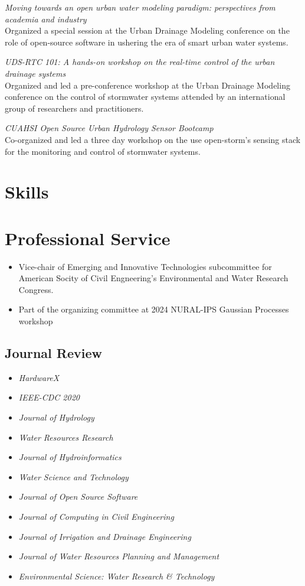 \documentclass[a4paper,11pt]{article}
\newcommand{\years}[1]{%
  {\reversemarginpar\strut\marginnote{{\small#1}}}%
}
\begin{document}
\years{2022} \emph{Moving towards an open urban water modeling paradigm: perspectives from
academia and industry}\\[.05cm]

Organized a special session at the Urban Drainage Modeling conference on the
role of open-source software in ushering the era of smart urban water systems.

\years{2022} \emph{UDS-RTC 101: A hands-on workshop on the real-time control of the urban
drainage systems}\\[.05cm]

Organized and led a pre-conference workshop at the Urban Drainage Modeling
conference on the control of stormwater systems attended by an international
group of researchers and practitioners.

\years{2017, 2019} \emph{CUAHSI Open Source Urban Hydrology Sensor Bootcamp}\\[.05cm]

Co-organized and led a three day workshop on the use open-storm’s sensing stack
for the monitoring and control of stormwater systems.

\section*{Skills}

\section*{Professional Service}
\begin{itemize}
	\item Vice-chair of Emerging and Innovative Technologies subcommittee for American Socity of Civil Engneering's Environmental and Water Research Congress. 
	\item Part of the organizing committee at 2024 NURAL-IPS Gaussian Processes workshop
\end{itemize}
\subsection*{Journal Review}
\begin{itemize}
	\item \textit{HardwareX}
	\item \textit{IEEE-CDC 2020}
	\item \textit{Journal of Hydrology}
	\item \textit{Water Resources Research}
	\item \textit{Journal of Hydroinformatics}
	\item \textit{Water Science and Technology}
	\item \textit{Journal of Open Source Software}
	\item \textit{Journal of Computing in Civil Engineering}
	\item \textit{Journal of Irrigation and Drainage Engineering}
	\item \textit{Journal of Water Resources Planning and Management}
	\item \textit{Environmental Science: Water Research \& Technology}
\end{itemize}
\end{document}
